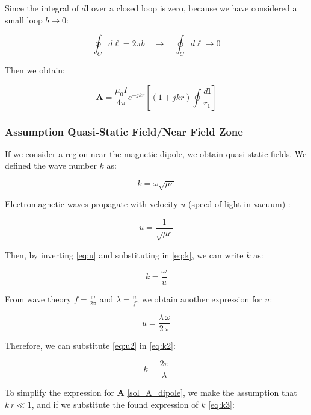 Since the integral of \(d\mathbf{l}\) over a closed loop 
is zero, because we have considered a small loop $b \to 0$:

\[
    \oint_C d\ell = 2\pi b \quad \rightarrow \quad 
    \oint_C d\ell \rightarrow 0
\]

Then we obtain:

\begin{equation}
    \mathbf{A} = \frac{\mu_0 I}{4 \pi} e^{-j k r} 
    \left[ \left(1 + j k r \right) \oint 
    \frac{d\mathbf{l}}{r_1}\right]
    \label{eq:sol_A_simp}
\end{equation}
\subsubsection{Assumption Quasi-Static Field/Near Field Zone}
If we consider a region near the magnetic dipole, we 
obtain quasi-static fields. We defined the wave number 
$k$ as:

\begin{equation}
    k = \omega \sqrt{\mu \epsilon}
    \label{eq:k}
\end{equation}

Electromagnetic waves propagate with velocity $u$ 
(speed of light in vacuum) \cite{book-magnetism}:

\begin{equation}
    u = \frac{1}{\sqrt{\mu \epsilon}}
    \label{eq:u}
\end{equation}

Then, by inverting \ref{eq:u} and substituting in 
\ref{eq:k}, we can write $k$ as:

\begin{equation}
    k = \frac{\omega}{u}
    \label{eq:k2}
\end{equation}

From wave theory $f = \frac{\omega}{2\pi}$ and 
$\lambda = \frac{u}{f}$, we obtain another expression 
for $u$:

\begin{equation}
   u = \frac{\lambda \, \omega}{2 \, \pi}
\end{equation}
\label{eq:u2}

\noindent Therefore, we can substitute \ref{eq:u2} in 
\ref{eq:k2}:

\begin{equation}
    k = \frac{2 \pi}{\lambda}
    \label{eq:k3}
\end{equation}

To simplify the expression for $\mathbf{A}$ 
\ref{sol_A_dipole}, we make the assumption that 
$k \, r \ll 1$, and if we substitute the found 
expression of $k$ \ref{eq:k3}:

